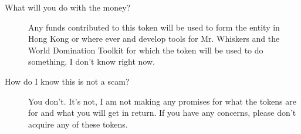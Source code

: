 \begin{description}
    \item[What will you do with the money?] Any funds contributed to this token will be used to form the entity in Hong Kong or where ever and develop tools for Mr. Whiskers and the World Domination Toolkit for which the token will be used to do something, I don't know right now.
    
    \item[How do I know this is not a scam?] You don't. It's not, I am not making any promises for what the tokens are for and what you will get in return. If you have any concerns, please don't acquire any of these tokens. 
    
\end{description}
